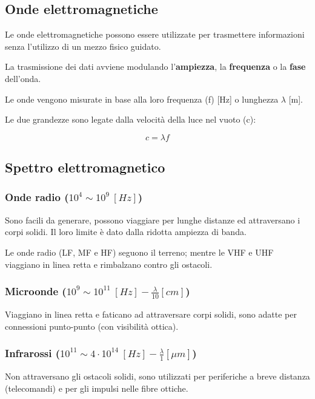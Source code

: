     \subsection{Onde elettromagnetiche}
        Le onde elettromagnetiche possono essere utilizzate per trasmettere informazioni senza l'utilizzo di un mezzo fisico guidato.

        La trasmissione dei dati avviene modulando l'\textbf{ampiezza}, la \textbf{frequenza} o la \textbf{fase} dell'onda.

        Le onde vengono misurate in base alla loro frequenza (f) [Hz] o lunghezza $\lambda$ [m].

        Le due grandezze sono legate dalla velocità della luce nel vuoto (c):

        \begin{equation*}
            c = \lambda f
        \end{equation*}

    \subsection{Spettro elettromagnetico}
        \subsubsection{Onde radio ($10^4\sim10^9 ~[Hz]$)}
            Sono facili da generare, possono viaggiare per lunghe distanze ed attraversano i corpi solidi. Il loro limite è dato dalla ridotta ampiezza di banda.
            
            Le onde radio (LF, MF e HF) seguono il terreno; mentre le VHF e UHF viaggiano in linea retta e rimbalzano contro gli ostacoli.

        \subsubsection{Microonde ($10^9\sim10^{11} ~[Hz] - \frac{\lambda}{10}[cm]$)}
            Viaggiano in linea retta e faticano ad attraversare corpi solidi, sono adatte per connessioni punto-punto (con visibilità ottica).

        \subsubsection{Infrarossi ($10^{11}\sim4 \cdot 10^{14} ~[Hz] - \frac{\lambda}{1}[\mu m]$)}
            Non attraversano gli ostacoli solidi, sono utilizzati per periferiche a breve distanza (telecomandi) e per gli impulsi nelle fibre ottiche.

